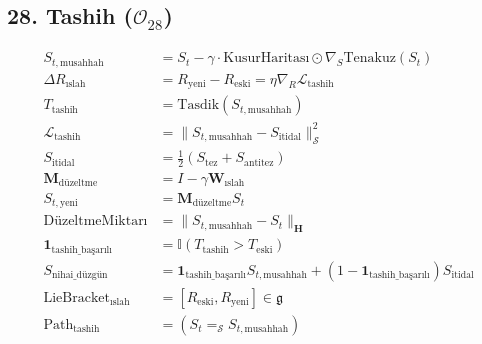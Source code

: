 \documentclass[11pt, a4paper]{article}
\begin{document}
\subsection{28. Tashih ($\mathcal{O}_{28}$)}
\begin{align}
S_{t, \text{musahhah}} &= S_t - \gamma \cdot \text{KusurHaritası} \odot \nabla_{S} \text{Tenakuz}(S_t) \\
\Delta R_{\text{ıslah}} &= R_{\text{yeni}} - R_{\text{eski}} = \eta \nabla_R \mathcal{L}_{\text{tashih}} \\
T_{\text{tashih}} &= \text{Tasdik}(S_{t, \text{musahhah}}) \\
\mathcal{L}_{\text{tashih}} &= \| S_{t, \text{musahhah}} - S_{\text{itidal}} \|_{\mathcal{S}}^2 \\
S_{\text{itidal}} &= \frac{1}{2} (S_{\text{tez}} + S_{\text{antitez}}) \\
\mathbf{M}_{\text{düzeltme}} &= I - \gamma \mathbf{W}_{\text{ıslah}} \\
S_{t, \text{yeni}} &= \mathbf{M}_{\text{düzeltme}} S_t \\
\text{DüzeltmeMiktarı} &= \|S_{t, \text{musahhah}} - S_t\|_{\mathbf{H}} \\
\mathbf{1}_{\text{tashih\_başarılı}} &= \mathbb{I}(T_{\text{tashih}} > T_{\text{eski}}) \\
S_{\text{nihai\_düzgün}} &= \mathbf{1}_{\text{tashih\_başarılı}} S_{t, \text{musahhah}} + (1 - \mathbf{1}_{\text{tashih\_başarılı}}) S_{\text{itidal}} \\
\text{LieBracket}_{\text{ıslah}} &= [R_{\text{eski}}, R_{\text{yeni}}] \in \mathfrak{g} \\
\text{Path}_{\text{tashih}} &= (S_t =_{\mathcal{S}} S_{t, \text{musahhah}})
\end{align}
\end{document}
